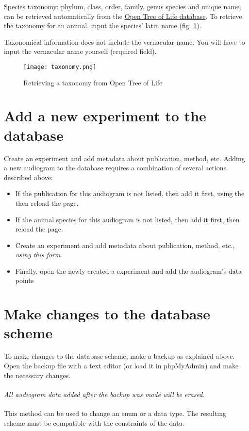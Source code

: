 \documentclass{article}
\begin{document}
Species taxonomy: phylum, class, order, family, genus species and unique name, can be retrieved automatically from the \href{https://opentreeoflife.github.io}{Open Tree of Life database}. To retrieve the taxonomy for an animal, input the species' latin name (fig. \ref{fig:taxonomy}).

Taxonomical information does not include the vernacular name. You will have to input the vernacular name yourself (required field).

\begin{figure}
\texttt{[image: taxonomy.png]}
\caption{Retrieving a taxonomy from Open Tree of Life}
\label{fig:taxonomy}
\end{figure}

\section{Add a new experiment to the database}
Create an experiment and add metadata about publication, method, etc.
Adding a new audiogram to the database requires a combination of several actions described above:

\begin{itemize}
\item{If the publication for this audiogram is not listed, then add it first, using the then reload the page.}
\item{If the animal species for this audiogram is not listed, then add it first, then reload the page.}
\item{Create an experiment and add metadata about publication, method, etc., \emph{using this form}}
\item{Finally, open the newly created a experiment and add the audiogram's data points}
\end{itemize}

\section{Make changes to the database scheme}
To make changes to the database scheme, make a backup as explained above. Open the backup file with a text editor (or load it in phpMyAdmin) and make the necessary changes.
\\\\
\emph{All audiogram data added after the backup was made will be erased.}
\\\\
This method can be used to change an enum or a data type. The resulting scheme must be compatible with the constraints of the data.
\end{document}
